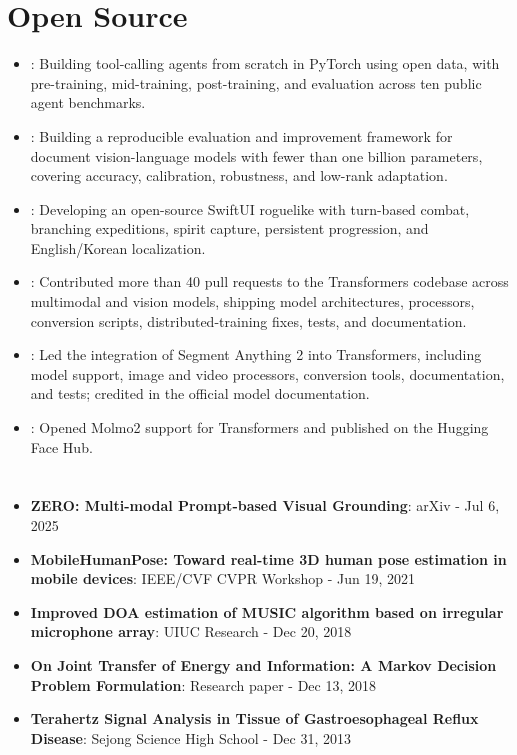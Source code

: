 \documentclass[letterpaper,11pt]{article}
\newcommand{\MYhref}[3][blue]{\href{#2}{\color{#1}{#3}}}
\newcommand{\resumeItem}[2]{
  \item\small{
    \textbf{#1}{: #2 \vspace{-2pt}}
  }
}
\newcommand{\resumeSubItem}[2]{\resumeItem{#1}{#2}\vspace{-4pt}}
\newcommand{\resumeSubHeadingListStart}{\begin{itemize}[leftmargin=*]}
\newcommand{\resumeSubHeadingListEnd}{\end{itemize}}
\begin{document}
\section{Open Source}
  \resumeSubHeadingListStart
    \resumeSubItem{\MYhref{https://github.com/SangbumChoi/OpenLocalAgent}{OpenLocalAgent}}
      {Building tool-calling agents from scratch in PyTorch using open data, with pre-training, mid-training, post-training, and evaluation across ten public agent benchmarks.}
    \resumeSubItem{\MYhref{https://github.com/SangbumChoi/OCR}{Optical Character Recognition}}
      {Building a reproducible evaluation and improvement framework for document vision-language models with fewer than one billion parameters, covering accuracy, calibration, robustness, and low-rank adaptation.}
    \resumeSubItem{\MYhref{https://github.com/SangbumChoi/Absorbed}{Absorbed}}
      {Developing an open-source SwiftUI roguelike with turn-based combat, branching expeditions, spirit capture, persistent progression, and English/Korean localization.}
    \resumeSubItem{\MYhref{https://github.com/huggingface/transformers/pulls?q=is\%3Apr+SangbumChoi}{Hugging Face Transformers}}
      {Contributed more than 40 pull requests to the Transformers codebase across multimodal and vision models, shipping model architectures, processors, conversion scripts, distributed-training fixes, tests, and documentation.}
    \resumeSubItem{\MYhref{https://github.com/huggingface/transformers/pull/32317}{Hugging Face Transformers - Segment Anything 2}}
      {Led the integration of Segment Anything 2 into Transformers, including model support, image and video processors, conversion tools, documentation, and tests; credited in the official model documentation.}
    \resumeSubItem{\MYhref{https://github.com/huggingface/transformers/pull/43451}{Hugging Face Transformers - Molmo2}}
      {Opened Molmo2 support for Transformers and published \MYhref{https://huggingface.co/danelcsb/Molmo2-4B}{danelcsb/Molmo2-4B} on the Hugging Face Hub.}
  \resumeSubHeadingListEnd

\section{\MYhref{https://scholar.google.co.kr/citations?user=4klHsscAAAAJ&hl=ko}{Papers}}
  \resumeSubHeadingListStart
    \resumeSubItem{ZERO: Multi-modal Prompt-based Visual Grounding}
      {arXiv - Jul 6, 2025}
    \resumeSubItem{MobileHumanPose: Toward real-time 3D human pose estimation in mobile devices}
      {IEEE/CVF CVPR Workshop - Jun 19, 2021}
    \resumeSubItem{Improved DOA estimation of MUSIC algorithm based on irregular microphone array}
      {UIUC Research - Dec 20, 2018}
    \resumeSubItem{On Joint Transfer of Energy and Information: A Markov Decision Problem Formulation}
      {Research paper - Dec 13, 2018}
    \resumeSubItem{Terahertz Signal Analysis in Tissue of Gastroesophageal Reflux Disease}
      {Sejong Science High School - Dec 31, 2013}
  \resumeSubHeadingListEnd
\end{document}
